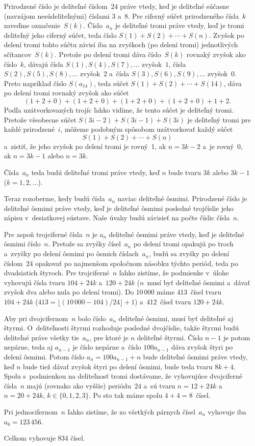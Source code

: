 {%
Prirodzené číslo je deliteľné číslom~$24$ práve vtedy, keď je deliteľné
súčasne (navzájom nesúdeliteľnými) číslami $3$ a~$8$.
Pre ciferný súčet prirodzeného čísla~$k$ zaveďme označenie~$S(k)$.
Číslo~$a_n$ je deliteľné tromi práve vtedy, keď je tromi
deliteľný jeho ciferný súčet, teda číslo
$S(1)+S(2)+\cdots+S(n)$. Zvyšok po delení tromi tohto súčtu
závisí iba na zvyškoch (po delení tromi) jednotlivých sčítancov~$S(k)$.
Pretože po delení tromi dáva číslo~$S(k)$ rovnaký zvyšok
ako číslo~$k$, dávajú čísla $S(1),
S(4),S(7),\dots$ zvyšok~$1$, čísla $S(2),S(5),
S(8),\dots$ zvyšok~$2$ a~čísla $S(3),S(6),S(9),\dots$
zvyšok~$0$. Preto napríklad číslo $S(a_{14})$, teda súčet
$S(1)+S(2)+\cdots+S(14)$, dáva po delení tromi rovnaký zvyšok
ako súčet
$$
(1+2+0)+(1+2+0)+(1+2+0)+(1+2+0)+1+2.
$$
Podľa uzátvorkovaných trojíc ľahko vidíme, že tento súčet je
deliteľný tromi. Pretože všeobecne súčet $S(3i-2)+S(3i-1)+S(3i)$ je
deliteľný tromi pre každé prirodzené~$i$, môžeme podobným spôsobom
uzátvorkovať každý súčet
$$
S(1)+S(2)+\cdots+S(n)
$$
a~zistiť, že jeho zvyšok po delení tromi
je rovný~1, ak $n=3k-2$ a~je rovný~0, ak $n=3k-1$ alebo $n=3k$.

Čísla~$a_n$ teda budú deliteľné tromi práve vtedy, keď $n$ bude tvaru
$3k$ alebo $3k-1$ ($k=1,2,\dots$).

Teraz rozoberme, kedy budú čísla~$a_n$ naviac deliteľné ôsmimi.
Prirodzené číslo je deliteľné ôsmimi práve vtedy, keď je deliteľné ôsmimi
posledné trojčíslie jeho zápisu v~desiatkovej sústave. Naše úvahy
budú závisieť na počte číslic čísla~$n$.

\smallskip
Pre aspoň trojciferné čísla~$n$ je $a_n$
deliteľné ôsmimi práve vtedy, keď je deliteľné ôsmimi číslo~$n$.
Pretože sa zvyšky čísel~$a_n$ po delení tromi opakujú po troch
a~zvyšky po delení ôsmimi po ôsmich číslach~$a_n$, budú sa zvyšky po
delení číslom~24 opakovať po najmenšom spoločnom násobku týchto
periód, teda po dvadsiatich štyroch. Pre trojciferné~$n$ ľahko
zistíme, že podmienke v~úlohe vyhovujú čísla tvaru $104+24k$ 
a~$120+24k$ ($n$~musí byť deliteľné ôsmimi a~dávať zvyšok dva alebo
nula po delení tromi). Do 10\,000 máme 413~čísel tvaru $104+24k$
($413=\lfloor(10\,000-104)/24\rfloor +1$) a~412~čísel
tvaru $120+24k$.

\smallskip
Aby pri dvojcifernom~$n$ bolo číslo~$a_n$ deliteľné ôsmimi, musí byť
deliteľné aj štyrmi. O~deliteľnosti štyrmi rozhoduje posledné
dvojčíslie, takže štyrmi budú deliteľné práve všetky tie~$a_n$,
pre ktoré je $n$ deliteľné štyrmi. Číslo $n-1$ je potom nepárne, teda
aj $a_{n-1}$ je číslo nepárne a~číslo $100a_{n-1}$ dáva zvyšok
štyri po delení ôsmimi. Potom číslo $a_n=100a_{n-1}+n$ bude
deliteľné ôsmimi práve vtedy, keď $n$ bude tiež dávať zvyšok štyri po
delení ôsmimi, bude teda tvaru $8k+4$. Spolu s~podmienkou na
deliteľnosť tromi dostávame, že vyhovujúce dvojciferné čísla~$n$
majú (rovnako ako vyššie) periódu~$24$ a~sú tvaru $n=12+24k$
a~$n=20+24k$, $k\in\{0,1,2,3\}$. Po sto tak máme spolu $4+4=8$~čísel.

\smallskip
Pri jednocifernom~$n$ ľahko zistíme, že zo všetkých
párnych čísel~$a_n$ vyhovuje iba $a_6=123\,456$.

\smallskip
Celkom vyhovuje 834 čísel.}

